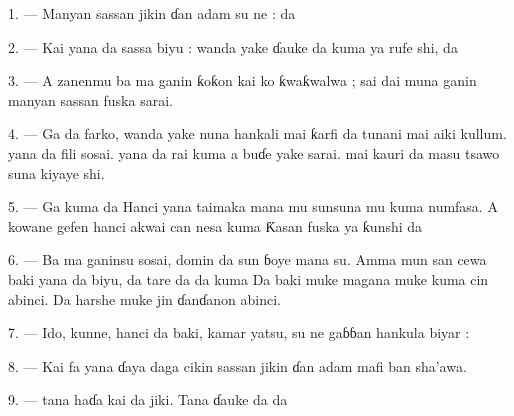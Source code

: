 \VUsaut{4.0mm}
\VUsaut{2.0mm}

\VUsaut{2.4mm}
\VUsaut{3.0mm}

\VUsaut{3.0mm}

1. --- Manyan sassan jikin ɗan adam su ne : 
 da 

2. --- Kai yana da sassa biyu :  wanda yake ɗauke
da  kuma  ya rufe shi, da

3. --- A zanenmu ba ma ganin ƙoƙon kai ko ƙwaƙwalwa ; sai dai muna
ganin manyan sassan fuska sarai.

4. --- Ga  da farko, wanda yake nuna hankali mai ƙarfi
da tunani mai aiki kullum.  yana da fili sosai.
 yana da rai kuma a buɗe yake sarai.  mai
kauri da  masu tsawo suna kiyaye shi.

5. --- Ga kuma  da  Hanci yana
taimaka mana mu sunsuna mu kuma numfasa. A kowane gefen hanci akwai
 can nesa kuma  Ƙasan fuska ya ƙunshi
 da 

6. --- Ba ma ganinsu sosai, domin  da
 sun ɓoye mana su. Amma mun san cewa baki yana da
 biyu,  da  tare da  da kuma  Da baki
muke magana muke kuma cin abinci. Da harshe muke jin ɗanɗanon abinci.

7. --- Ido, kunne, hanci da baki, kamar yatsu, su ne gaɓɓan hankula
biyar :   
 

8. --- Kai fa yana ɗaya daga cikin sassan jikin ɗan adam mafi ban
sha’awa.

\VUsaut{4.4mm}
\VUsaut{3.0mm}

9. ---  tana haɗa kai da jiki. Tana ɗauke da
 da 

